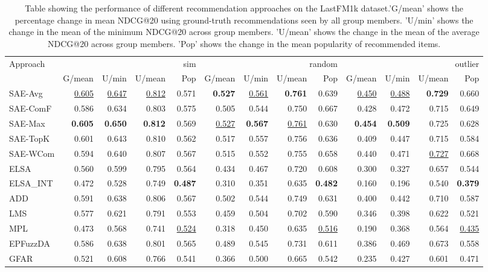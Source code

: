 \begin{table}
\caption{Table showing the performance of different recommendation approaches on the LastFM1k dataset.'G/mean' shows the percentage change in mean NDCG@20 using ground-truth recommendations seen by all group members. 'U/min' shows the change in the mean of the minimum NDCG@20 across group members. 'U/mean' shows the change in the mean of the average NDCG@20 across group members. 'Pop' shows the change in the mean popularity of recommended items.}
\label{tab:other:lastfm}
\begin{tabular}{l|rrrr|rrrr|rrrr}
\toprule
Approach & \multicolumn{4}{r}{sim} & \multicolumn{4}{r}{random} & \multicolumn{4}{r}{outlier} \\
 & G/mean & U/min & U/mean & Pop & G/mean & U/min & U/mean & Pop & G/mean & U/min & U/mean & Pop \\
\midrule
SAE-Avg & \underline{0.605} & \underline{0.647} & \underline{0.812} & 0.571 & \textbf{0.527} & \underline{0.561} & \textbf{0.761} & 0.639 & \underline{0.450} & \underline{0.488} & \textbf{0.729} & 0.660 \\
SAE-ComF & 0.586 & 0.634 & 0.803 & 0.575 & 0.505 & 0.544 & 0.750 & 0.667 & 0.428 & 0.472 & 0.715 & 0.649 \\
SAE-Max & \textbf{0.605} & \textbf{0.650} & \textbf{0.812} & 0.569 & \underline{0.527} & \textbf{0.567} & \underline{0.761} & 0.630 & \textbf{0.454} & \textbf{0.509} & 0.725 & 0.628 \\
SAE-TopK & 0.601 & 0.643 & 0.810 & 0.562 & 0.517 & 0.557 & 0.756 & 0.636 & 0.409 & 0.447 & 0.715 & 0.584 \\
SAE-WCom & 0.594 & 0.640 & 0.807 & 0.567 & 0.515 & 0.552 & 0.755 & 0.658 & 0.440 & 0.471 & \underline{0.727} & 0.668 \\
ELSA & 0.560 & 0.599 & 0.795 & 0.564 & 0.434 & 0.467 & 0.720 & 0.608 & 0.300 & 0.327 & 0.657 & 0.544 \\
ELSA_INT & 0.472 & 0.528 & 0.749 & \textbf{0.487} & 0.310 & 0.351 & 0.635 & \textbf{0.482} & 0.160 & 0.196 & 0.540 & \textbf{0.379} \\
ADD & 0.591 & 0.638 & 0.806 & 0.567 & 0.502 & 0.544 & 0.749 & 0.631 & 0.400 & 0.442 & 0.710 & 0.587 \\
LMS & 0.577 & 0.621 & 0.791 & 0.553 & 0.459 & 0.504 & 0.702 & 0.590 & 0.346 & 0.398 & 0.622 & 0.521 \\
MPL & 0.473 & 0.568 & 0.741 & \underline{0.524} & 0.318 & 0.450 & 0.635 & \underline{0.516} & 0.190 & 0.368 & 0.564 & \underline{0.435} \\
EPFuzzDA & 0.586 & 0.638 & 0.801 & 0.565 & 0.489 & 0.545 & 0.731 & 0.611 & 0.386 & 0.469 & 0.673 & 0.558 \\
GFAR & 0.521 & 0.608 & 0.766 & 0.541 & 0.366 & 0.500 & 0.665 & 0.542 & 0.235 & 0.427 & 0.601 & 0.471 \\
\bottomrule
\end{tabular}
\end{table}
